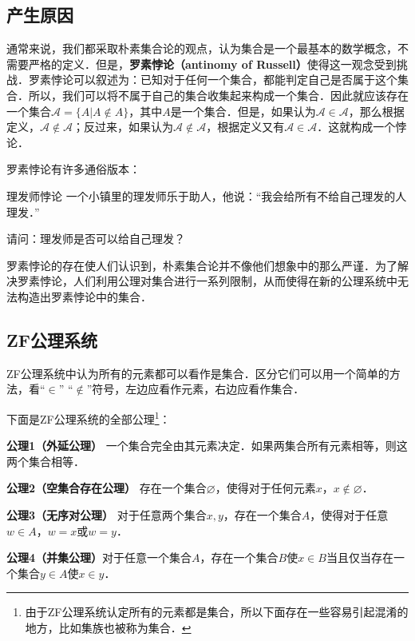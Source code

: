 \begin{issues}
\issueDraft
\end{issues}

\subsection{产生原因}
通常来说，我们都采取朴素集合论的观点，认为集合是一个最基本的数学概念，不需要严格的定义．但是，\textbf{罗素悖论（antinomy of Russell）}使得这一观念受到挑战．罗素悖论可以叙述为：已知对于任何一个集合，都能判定自己是否属于这个集合．所以，我们可以将不属于自己的集合收集起来构成一个集合．因此就应该存在一个集合$\mathcal{A}=\{A|A\notin A\}$，其中$A$是一个集合．但是，如果认为$\mathcal{A}\in\mathcal{A}$，那么根据定义，$\mathcal{A}\notin\mathcal{A}$；反过来，如果认为$\mathcal{A}\notin\mathcal{A}$，根据定义又有$\mathcal{A}\in\mathcal{A}$．这就构成一个悖论．

罗素悖论有许多通俗版本：
\begin{example}{理发师悖论}
一个小镇里的理发师乐于助人，他说：“我会给所有不给自己理发的人理发．”

请问：理发师是否可以给自己理发？
\end{example}

罗素悖论的存在使人们认识到，朴素集合论并不像他们想象中的那么严谨．为了解决罗素悖论，人们利用公理对集合进行一系列限制，从而使得在新的公理系统中无法构造出罗素悖论中的集合．

\subsection{ZF公理系统}
ZF公理系统中认为所有的元素都可以看作是集合．区分它们可以用一个简单的方法，看“$\in$” “$\notin$”符号，左边应看作元素，右边应看作集合．

下面是ZF公理系统的全部公理\footnote{由于ZF公理系统认定所有的元素都是集合，所以下面存在一些容易引起混淆的地方，比如集族也被称为集合．}：

\textbf{公理1（外延公理）} 一个集合完全由其元素决定．如果两集合所有元素相等，则这两个集合相等．

\textbf{公理2（空集合存在公理）} 存在一个集合$\varnothing$，使得对于任何元素$x$，$x\notin\varnothing$．

\textbf{公理3（无序对公理）} 对于任意两个集合$x,y$，存在一个集合$A$，使得对于任意$w\in A$，$w=x$或$w=y$．

\textbf{公理4（并集公理）}对于任意一个集合$A$，存在一个集合$B$使$x\in B$当且仅当存在一个集合$y\in A$使$x\in y$．

